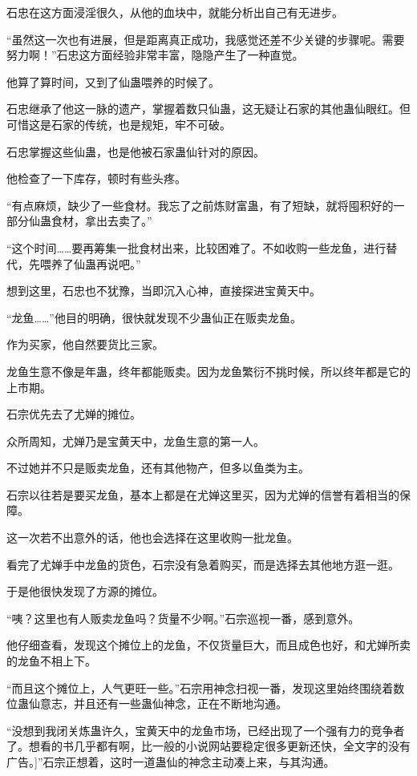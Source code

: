 
\begin{this_body}

石忠在这方面浸淫很久，从他的血块中，就能分析出自己有无进步。

“虽然这一次也有进展，但是距离真正成功，我感觉还差不少关键的步骤呢。需要努力啊！”石忠这方面经验非常丰富，隐隐产生了一种直觉。

他算了算时间，又到了仙蛊喂养的时候了。

石忠继承了他这一脉的遗产，掌握着数只仙蛊，这无疑让石家的其他蛊仙眼红。但可惜这是石家的传统，也是规矩，牢不可破。

石忠掌握这些仙蛊，也是他被石家蛊仙针对的原因。

他检查了一下库存，顿时有些头疼。

“有点麻烦，缺少了一些食材。我忘了之前炼财富蛊，有了短缺，就将囤积好的一部分仙蛊食材，拿出去卖了。”

“这个时间……要再筹集一批食材出来，比较困难了。不如收购一些龙鱼，进行替代，先喂养了仙蛊再说吧。”

想到这里，石忠也不犹豫，当即沉入心神，直接探进宝黄天中。

“龙鱼……”他目的明确，很快就发现不少蛊仙正在贩卖龙鱼。

作为买家，他自然要货比三家。

龙鱼生意不像是年蛊，终年都能贩卖。因为龙鱼繁衍不挑时候，所以终年都是它的上市期。

石宗优先去了尤婵的摊位。

众所周知，尤婵乃是宝黄天中，龙鱼生意的第一人。

不过她并不只是贩卖龙鱼，还有其他物产，但多以鱼类为主。

石宗以往若是要买龙鱼，基本上都是在尤婵这里买，因为尤婵的信誉有着相当的保障。

这一次若不出意外的话，他也会选择在这里收购一批龙鱼。

看完了尤婵手中龙鱼的货色，石宗没有急着购买，而是选择去其他地方逛一逛。

于是他很快发现了方源的摊位。

“咦？这里也有人贩卖龙鱼吗？货量不少啊。”石宗巡视一番，感到意外。

他仔细查看，发现这个摊位上的龙鱼，不仅货量巨大，而且成色也好，和尤婵所卖的龙鱼不相上下。

“而且这个摊位上，人气更旺一些。”石宗用神念扫视一番，发现这里始终围绕着数位蛊仙意志，并且还有一些蛊仙神念，正在不断地沟通。

“没想到我闭关炼蛊许久，宝黄天中的龙鱼市场，已经出现了一个强有力的竞争者了。想看的书几乎都有啊，比一般的小说网站要稳定很多更新还快，全文字的没有广告。]”石宗正想着，这时一道蛊仙的神念主动凑上来，与其沟通。


\end{this_body}
